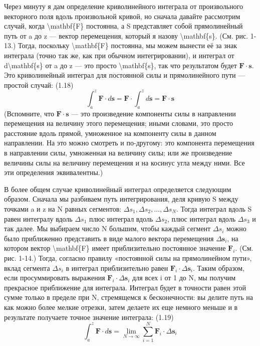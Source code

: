 \documentclass[10pt,oneside]{article}
\begin{document}
Через минуту я дам определение криволинейного интеграла от произвольного векторного поля вдоль произвольной кривой, но сначала давайте рассмотрим случай, когда \textbackslash{}mathbf\{F\} постоянна, а S представляет собой прямолинейный путь от a до z --- вектор перемещения, который я назову \textbackslash{}mathbf\{s\}. (См. рис. 1-13.) Тогда, поскольку \textbackslash{}mathbf\{F\} постоянна, мы можем вынести её за знак интеграла (точно так же, как при обычном интегрировании), и интеграл от d\textbackslash{}mathbf\{s\} от a до z --- это просто \textbackslash{}mathbf\{s\}, так что результатом будет \(\mathbf{F} \cdot \mathbf{s}\). Это криволинейный интеграл для постоянной силы и прямолинейного пути --- простой случай: (1.18) \[\int_a^z \mathbf{F} \cdot d\mathbf{s} = \mathbf{F} \cdot \int_a^z d\mathbf{s} = \mathbf{F} \cdot \mathbf{s}\] (Вспомните, что \(\mathbf{F} \cdot \mathbf{s}\) --- это произведение компоненты силы в направлении перемещения на величину этого перемещения; иными словами, это просто расстояние вдоль прямой, умноженное на компоненту силы в данном направлении. На это можно смотреть и по-другому: это компонента перемещения в направлении силы, умноженная на величину силы; или же произведение величины силы на величину перемещения и на косинус угла между ними. Все эти определения эквивалентны.)\par

В более общем случае криволинейный интеграл определяется следующим образом. Сначала мы разбиваем путь интегрирования, деля кривую S между точками a и z на N равных сегментов: \(\Delta s_1, \Delta s_2, \dots, \Delta s_N\). Тогда интеграл вдоль S равен интегралу вдоль \(\Delta s_1\) плюс интеграл вдоль \(\Delta s_2\), плюс интеграл вдоль \(\Delta s_3\) и так далее. Мы выбираем число N большим, чтобы каждый сегмент \(\Delta s_i\) можно было приближенно представить в виде малого вектора перемещения \(\Delta \mathbf{s}_i\), на котором вектор \textbackslash{}mathbf\{F\} имеет приблизительно постоянное значение \(\mathbf{F}_i\). (См. рис. 1-14.) Тогда, согласно правилу «постоянной силы на прямолинейном пути», вклад сегмента \(\Delta s_i\) в интеграл приблизительно равен \(\mathbf{F}_i \cdot \Delta \mathbf{s}_i\). Таким образом, если просуммировать выражения \(\mathbf{F}_i \cdot \Delta \mathbf{s}_i\) для всех i от 1 до N, мы получим прекрасное приближение для интеграла. Интеграл будет в точности равен этой сумме только в пределе при N, стремящемся к бесконечности: вы делите путь на как можно более мелкие отрезки, затем делаете их еще немного меньше и в результате получаете точное значение интеграла: (1.19) \[\int_a^z \mathbf{F} \cdot d\mathbf{s} = \lim_{N \to \infty} \sum_{i=1}^N \mathbf{F}_i \cdot \Delta \mathbf{s}_i\]\par
\end{document}
